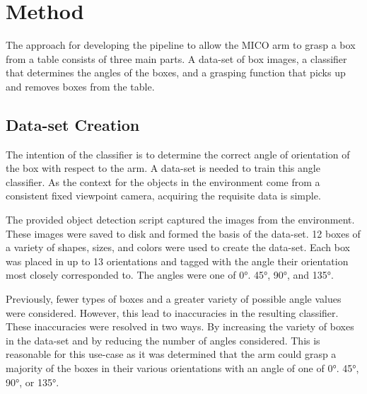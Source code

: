 \documentclass[letterpaper, 10 pt, conference]{conf/ieeeconf}  %
\begin{document}
\section{Method}
\label{sec:method}


The approach for developing the pipeline to allow the MICO arm to grasp a box
from a table consists of three main parts. A data-set of box images, a
classifier that determines the angles of the boxes, and a grasping function that
picks up and removes boxes from the table.

\subsection{Data-set Creation} %

The intention of the classifier is to determine the correct angle of orientation
of the box with respect to the arm. A data-set is needed to train this angle
classifier. As the context for the objects in the environment come from a
consistent fixed viewpoint camera, acquiring the requisite data is simple.

The provided object detection script captured the images from the environment.
These images were saved to disk and formed the basis of the data-set. 12 boxes
of a variety of shapes, sizes, and colors were used to create the data-set. Each
box was placed in up to 13 orientations and tagged with the angle their
orientation most closely corresponded to. The angles were one of \ang{0}.
\ang{45}, \ang{90}, and \ang{135}.

Previously, fewer types of boxes and a greater variety of possible angle values
were considered. However, this lead to inaccuracies in the resulting classifier.
These inaccuracies were resolved in two ways. By increasing the variety of boxes
in the data-set and by reducing the number of angles considered. This is
reasonable for this use-case as it was determined that the arm could grasp a
majority of the boxes in their various orientations with an angle of one of
\ang{0}. \ang{45}, \ang{90}, or \ang{135}.
\end{document}
